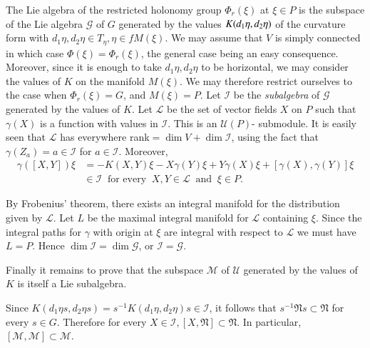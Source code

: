 The Lie algebra of the restricted holonomy group $\Phi_r (\xi)$ at $\xi
\in P$ is the subspace of the Lie algebra $\mathscr{G}$ of $G$
generated by the values $K(d_1 \eta,\break d_2 \eta)$ of the curvature form
with $d_1 \eta, d_2 \eta \in T_{\eta}, \eta \in f M(\xi)$. 
We may assume that $V$ is simply connected in which case $\Phi (\xi) =
\Phi_r (\xi)$, the general case being an easy consequence. Moreover,
since it is enough to take $d_1 \eta, d_2 \eta$ to be horizontal, we
may consider the values of $K$ on the manifold $M(\xi)$. We may
therefore restrict ourselves to the case when $\Phi_r (\xi) = G$, and
$M(\xi) =P$. Let $\mathscr{I}$ be the \textit{ subalgebra } of
$\mathscr{G}$ generated by the values of $K$. Let $\mathscr{L}$ be the
set of vector fields $X$ on $P$ such that $\gamma (X)$ is a function
with values in $\mathscr{I}$. This is an $\mathscr{U}(P)$-
submodule. It is easily seen that $\mathscr{L}$ has everywhere rank\pageoriginale$=
\dim V + \dim \mathscr{I}$, using the fact that $\gamma (Z_a)=a \in
\mathscr{I}$ for $a \in \mathscr{I}$. Moreover, 
\begin{align*}
  \gamma ([X, Y]) \xi & = -K(X, Y) \xi- X \gamma (Y) \xi + Y \gamma (X)
  \xi + [ \gamma (X) , \gamma (Y) ] \xi\\ 
  & \in \mathscr{I} ~\text{ for every }~  X, Y \in \mathscr{L}~
  \text{ and }~ \xi \in P. 
\end{align*}

By Frobenius' theorem, there exists an integral manifold for the
distribution given by $\mathscr{L}$. Let $L$ be the maximal integral
manifold for $\mathscr{L}$ containing $\xi$. Since the integral paths
for $\gamma$ with origin at $\xi$ are integral with respect to
$\mathscr{L}$ we must have $L = P$. Hence $\dim \mathscr{I} = \dim
\mathscr{G}$, or $\mathscr{I} = \mathscr{G}$.  

Finally it remains to prove that the subspace $\mathscr{M}$ of
$\mathscr{U}$ generated by the values of $K$ is itself a Lie
subalgebra. 

Since $K(d_1 \eta s, d_2 \eta s) = s^{-1}K(d_1 \eta , d_2 \eta) s \in
\mathscr{I}$, it follows that $s^{-1} \mathfrak{N} s \subset
\mathfrak{N}$ for every $s \in G$. Therefore for every $X \in
\mathscr{I}, [X, \mathfrak{N}] \subset \mathfrak{N}$. In particular,
$[\mathscr{M},\mathscr{M}] \subset \mathscr{M}$. 

